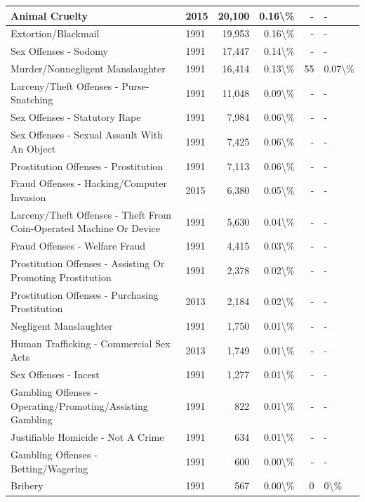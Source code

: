 \documentclass[
]{krantz}
\begin{document}
\begin{longtable}[t]{l|l|r|r|r|l}
\hline
Animal Cruelty & 2015 & 20,100 & 0.16\textbackslash{}\% & - & -\\
\hline
Extortion/Blackmail & 1991 & 19,953 & 0.16\textbackslash{}\% & - & -\\
\hline
Sex Offenses - Sodomy & 1991 & 17,447 & 0.14\textbackslash{}\% & - & -\\
\hline
Murder/Nonnegligent Manslaughter & 1991 & 16,414 & 0.13\textbackslash{}\% & 55 & 0.07\textbackslash{}\%\\
\hline
Larceny/Theft Offenses - Purse-Snatching & 1991 & 11,048 & 0.09\textbackslash{}\% & - & -\\
\hline
Sex Offenses - Statutory Rape & 1991 & 7,984 & 0.06\textbackslash{}\% & - & -\\
\hline
Sex Offenses - Sexual Assault With An Object & 1991 & 7,425 & 0.06\textbackslash{}\% & - & -\\
\hline
Prostitution Offenses - Prostitution & 1991 & 7,113 & 0.06\textbackslash{}\% & - & -\\
\hline
Fraud Offenses - Hacking/Computer Invasion & 2015 & 6,380 & 0.05\textbackslash{}\% & - & -\\
\hline
Larceny/Theft Offenses - Theft From Coin-Operated Machine Or Device & 1991 & 5,630 & 0.04\textbackslash{}\% & - & -\\
\hline
Fraud Offenses - Welfare Fraud & 1991 & 4,415 & 0.03\textbackslash{}\% & - & -\\
\hline
Prostitution Offenses - Assisting Or Promoting Prostitution & 1991 & 2,378 & 0.02\textbackslash{}\% & - & -\\
\hline
Prostitution Offenses - Purchasing Prostitution & 2013 & 2,184 & 0.02\textbackslash{}\% & - & -\\
\hline
Negligent Manslaughter & 1991 & 1,750 & 0.01\textbackslash{}\% & - & -\\
\hline
Human Trafficking - Commercial Sex Acts & 2013 & 1,749 & 0.01\textbackslash{}\% & - & -\\
\hline
Sex Offenses - Incest & 1991 & 1,277 & 0.01\textbackslash{}\% & - & -\\
\hline
Gambling Offenses - Operating/Promoting/Assisting Gambling & 1991 & 822 & 0.01\textbackslash{}\% & - & -\\
\hline
Justifiable Homicide - Not A Crime & 1991 & 634 & 0.01\textbackslash{}\% & - & -\\
\hline
Gambling Offenses - Betting/Wagering & 1991 & 600 & 0.00\textbackslash{}\% & - & -\\
\hline
Bribery & 1991 & 567 & 0.00\textbackslash{}\% & 0 & 0\textbackslash{}\%\\

\end{longtable}
\end{document}
